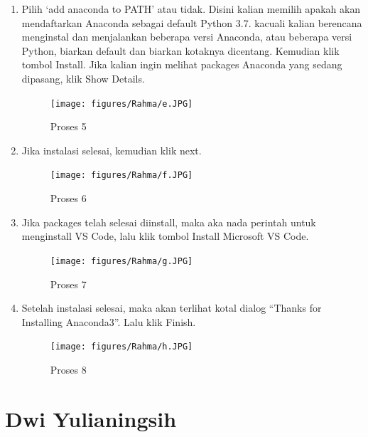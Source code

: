 \begin{itemize}
\begin{enumerate}
\item Pilih ‘add anaconda to PATH’ atau tidak. Disini kalian memilih apakah akan mendaftarkan Anaconda sebagai default Python 3.7. kacuali kalian berencana menginstal dan menjalankan beberapa versi Anaconda, atau beberapa versi Python, biarkan default dan biarkan kotaknya dicentang. Kemudian klik tombol Install. Jika kalian ingin melihat packages Anaconda yang sedang dipasang, klik Show Details.
\begin{figure}[ht]
	\centerline{\texttt{[image: figures/Rahma/e.JPG]}}
	\caption{Proses 5 }
	\label{gambar5 }
\end{figure}

\item Jika instalasi selesai, kemudian klik next.
\begin{figure}[ht]
	\centerline{\texttt{[image: figures/Rahma/f.JPG]}}
	\caption{Proses 6 }
	\label{gambar6 }
\end{figure}

\item Jika packages telah selesai diinstall, maka aka nada perintah untuk menginstall VS Code, lalu klik tombol Install Microsoft VS Code.
\begin{figure}[ht]
	\centerline{\texttt{[image: figures/Rahma/g.JPG]}}
	\caption{Proses 7}
	\label{gambar7 }
\end{figure}

\item Setelah instalasi selesai, maka akan terlihat kotal dialog “Thanks for Installing Anaconda3”. Lalu klik Finish.
\begin{figure}[ht]
	\centerline{\texttt{[image: figures/Rahma/h.JPG]}}
	\caption{Proses 8}
	\label{gambar8 }
\end{figure}
	    \end{enumerate}
\end{itemize}

\section{Dwi Yulianingsih}
